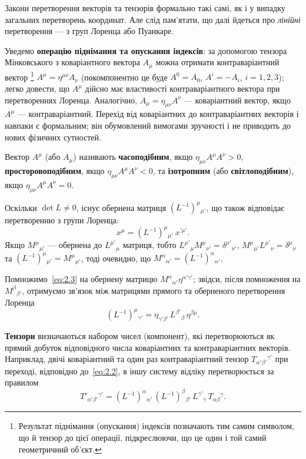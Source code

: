 Закони перетворення векторів та тензорів формально такі самі, як і у
випадку загальних перетворень координат. Але слід пам'ятати, що далі
йдеться про \textit{лінійні} перетворення --- з груп Лоренца або Пуанкаре.

Уведемо \textbf{операцію піднімання та опускання індексів}: за допомогою
тензора Мінковського з коваріантного вектора $A_\mu$ можна отримати
контраваріантний вектор%
\footnote{Результат піднімання (опускання) індексів позначають тим самим
символом, що й тензор до цієї операції, підкреслюючи, що це один і той
самий геометричний об'єкт.}
$A^\mu = \eta^{\mu\nu} A_\nu$ (покомпонентно це буде
$A^0 = A_0$, $A^i = -A_i$, $i=1,2,3$); легко довести, що $A^\mu$ дійсно має
властивості контраваріантного вектора при перетвореннях Лоренца.
Аналогічно, $A_\mu = \eta_{\mu\nu} A^\nu$ --- коваріантний вектор, якщо
$A^\mu$ --- контраваріантний. Перехід від коваріантних до контраваріантних
векторів і навпаки є формальним; він обумовлений вимогами зручності і не
приводить до нових фізичних сутностей.

Вектор $A^\mu$ (або $A_\mu$) називають \textbf{часоподібним}, якщо
$\eta_{\mu\nu}A^\mu A^\nu > 0$, \textbf{просторовоподібним}, якщо
$\eta_{\mu\nu}A^\mu A^\nu < 0$, та \textbf{ізотропним} (або
\textbf{світлоподібним}), якщо $\eta_{\mu\nu}A^\mu A^\nu = 0$.

Оскільки $\det L \ne 0$, існує обернена матриця $(L^{-1})^\mu{}_{\mu'}$,
що також відповідає перетворенню з групи Лоренца:
\[
  x^\mu = (L^{-1})^\mu{}_{\mu'}\, x^{\prime\mu'}.
\]
Якщо $M^\mu{}_{\mu'}$ --- обернена до $L^{\mu'}{}_\mu$ матриця, тобто
$L^{\mu'}{}_\mu M^\mu{}_{\nu'} = \delta^{\mu'}{}_{\nu'}$,
$M^\mu{}_{\mu'} L^{\mu'}{}_\nu = \delta^\mu{}_\nu$ та
$(L^{-1})^\mu{}_{\mu'} = M^\mu{}_{\mu'}$, тоді очевидно, що
$M^\alpha{}_{\alpha'} = (L^{-1})^\alpha{}_{\alpha'}$.

Помножимо~\eqref{eq:2.3} на обернену матрицю
$M^\alpha{}_{\alpha'} \eta^{\alpha'\gamma'}$;
звідси, після помноження на $M^\beta{}_{\beta'}$,
отримуємо зв'язок між матрицями прямого та оберненого перетворення Лоренца
\begin{equation}
  (L^{-1})^\mu{}_{\gamma'} = \eta_{\gamma'\beta'}\, L^{\beta'}{}_\beta\, \eta^{\beta\mu}.
  \label{eq:2.4}
\end{equation}

\textbf{Тензори} визначаються набором чисел (компонент), які перетворюються
як прямий добуток відповідного числа коваріантних та контраваріантних
векторів. Наприклад, двічі коваріантний та один раз контраваріантний тензор
$T_{\alpha'\beta'}{}^{\gamma'}$ при переході, відповідно до~\eqref{eq:2.2},
в іншу систему відліку перетворюється за правилом
\[
  T'_{\alpha'\beta'}{}^{\gamma'} =
  (L^{-1})^\alpha{}_{\alpha'}\,(L^{-1})^\beta{}_{\beta'}\,
  L^{\gamma'}{}_\gamma\, T_{\alpha\beta}{}^\gamma.
\]


